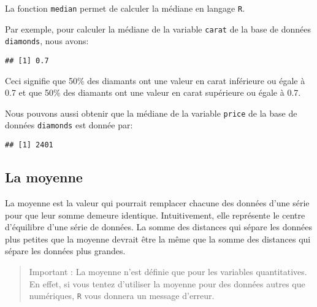 \documentclass[]{book}
\newenvironment{Shaded}{\begin{snugshade}}{\end{snugshade}}
\newcommand{\KeywordTok}[1]{\textcolor[rgb]{0.13,0.29,0.53}{\textbf{#1}}}
\newcommand{\OperatorTok}[1]{\textcolor[rgb]{0.81,0.36,0.00}{\textbf{#1}}}
\newcommand{\NormalTok}[1]{#1}
\begin{document}
La fonction \texttt{median} permet de calculer la médiane en langage
\texttt{R}.

Par exemple, pour calculer la médiane de la variable \texttt{carat} de
la base de données \texttt{diamonds}, nous avons:

\begin{Shaded}
\end{Shaded}

\begin{verbatim}
## [1] 0.7
\end{verbatim}

Ceci signifie que 50\% des diamants ont une valeur en carat inférieure
ou égale à 0.7 et que 50\% des diamants ont une valeur en carat
supérieure ou égale à 0.7.

Nous pouvons aussi obtenir que la médiane de la variable \texttt{price}
de la base de données \texttt{diamonds} est donnée par:

\begin{Shaded}
\end{Shaded}

\begin{verbatim}
## [1] 2401
\end{verbatim}

\subsection{La moyenne}\label{la-moyenne}

La moyenne est la valeur qui pourrait remplacer chacune des données
d'une série pour que leur somme demeure identique. Intuitivement, elle
représente le centre d'équilibre d'une série de données. La somme des
distances qui sépare les données plus petites que la moyenne devrait
être la même que la somme des distances qui sépare les données plus
grandes.

\begin{quote}
Important : La moyenne n'est définie que pour les variables
quantitatives. En effet, si vous tentez d'utiliser la moyenne pour des
données autres que numériques, \texttt{R} vous donnera un message
d'erreur.
\end{quote}
\end{document}
